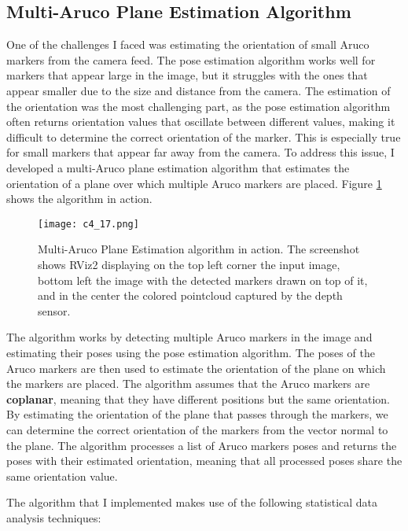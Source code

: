 \subsection{Multi-Aruco Plane Estimation Algorithm}

One of the challenges I faced was estimating the orientation of small Aruco markers from the camera feed.
The pose estimation algorithm works well for markers that appear large in the image, but it struggles with
the ones that appear smaller due to the size and distance from the camera. The estimation of the orientation
was the most challenging part, as the pose estimation algorithm often returns orientation values that
oscillate between different values, making it difficult to determine the correct orientation of the marker.
This is especially true for small markers that appear far away from the camera. To address this issue,
I developed a multi-Aruco plane estimation algorithm that estimates the orientation of a plane over which
multiple Aruco markers are placed. Figure \ref{fig:multi_aruco} shows the algorithm in action.

\begin{figure}[t]
    \centering
    \texttt{[image: c4\_17.png]}
    \caption{Multi-Aruco Plane Estimation algorithm in action. The screenshot shows RViz2 displaying
    on the top left corner the input image, bottom left the image with the detected markers drawn on top of it,
    and in the center the colored pointcloud captured by the depth sensor.}
    \label{fig:multi_aruco}
\end{figure}

The algorithm works by detecting multiple Aruco markers in the image and estimating their poses using the pose
estimation algorithm. The poses of the Aruco markers are then used to estimate the orientation of the plane
on which the markers are placed. The algorithm assumes that the Aruco markers are \textbf{coplanar}, meaning that 
they have different positions but the same orientation. By estimating the orientation of the plane that passes
through the markers, we can determine the correct orientation of the markers from the vector normal
to the plane. The algorithm processes a list of Aruco markers poses and returns the poses with their
estimated orientation, meaning that all processed poses share the same orientation value.

The algorithm that I implemented makes use of the following statistical data analysis techniques:

